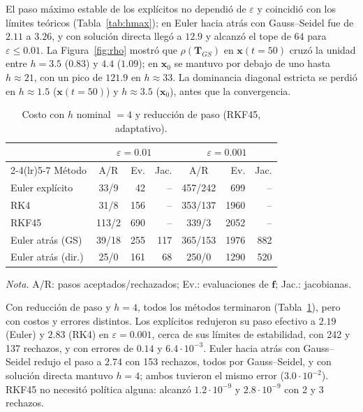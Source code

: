 El paso máximo estable de los explícitos no dependió de $\varepsilon$ y coincidió con los límites teóricos (Tabla~\ref{tab:hmax}); en Euler hacia atrás con Gauss--Seidel fue de $2.11$ a $3.26$, y con solución directa llegó a $12.9$ y alcanzó el tope de $64$ para $\varepsilon\le0.01$. La Figura~\ref{fig:rho} mostró que $\rho(\mathbf T_{GS})$ en $\mathbf x(t=50)$ cruzó la unidad entre $h=3.5$ ($0.83$) y $4.4$ ($1.09$); en $\mathbf x_0$ se mantuvo por debajo de uno hasta $h\approx21$, con un pico de $121.9$ en $h\approx33$. La dominancia diagonal estricta se perdió en $h\approx1.5$ ($\mathbf x(t=50)$) y $h\approx3.5$ ($\mathbf x_0$), antes que la convergencia.



\begin{table}[!htb]
\centering\footnotesize
\setlength{\tabcolsep}{2.5pt}
\caption{Costo con $h$ nominal $=4$ y reducción de paso (RKF45, adaptativo).}
\label{tab:rechazos}
\begin{tabular}{lcrrcrr}
\toprule & \multicolumn{3}{c}{$\varepsilon=0.01$} & \multicolumn{3}{c}{$\varepsilon=0.001$} \\
\cmidrule(lr){2-4}\cmidrule(lr){5-7}
Método & A/R & Ev. & Jac. & A/R & Ev. & Jac. \\ \midrule
Euler explícito & 33/9 & 42 & -- & 457/242 & 699 & -- \\
RK4 & 31/8 & 156 & -- & 353/137 & 1960 & -- \\
RKF45 & 113/2 & 690 & -- & 339/3 & 2052 & -- \\
Euler atrás (GS) & 39/18 & 255 & 117 & 365/153 & 1976 & 882 \\
Euler atrás (dir.) & 25/0 & 161 & 68 & 250/0 & 1290 & 520 \\
\bottomrule
\end{tabular}
\par{\scriptsize\textit{Nota.} A/R: pasos aceptados/rechazados; Ev.: evaluaciones de $\mathbf f$; Jac.: jacobianas.\par}
\end{table}

Con reducción de paso y $h=4$, todos los métodos terminaron (Tabla~\ref{tab:rechazos}), pero con costos y errores distintos. Los explícitos redujeron su paso efectivo a $2.19$ (Euler) y $2.83$ (RK4) en $\varepsilon=0.001$, cerca de sus límites de estabilidad, con 242 y 137 rechazos, y con errores de $0.14$ y $6.4\cdot10^{-3}$. Euler hacia atrás con Gauss--Seidel redujo el paso a $2.74$ con 153 rechazos, todos por Gauss--Seidel, y con solución directa mantuvo $h=4$; ambos tuvieron el mismo error ($3.0\cdot10^{-2}$). RKF45 no necesitó política alguna: alcanzó $1.2\cdot10^{-9}$ y $2.8\cdot10^{-9}$ con 2 y 3 rechazos.


